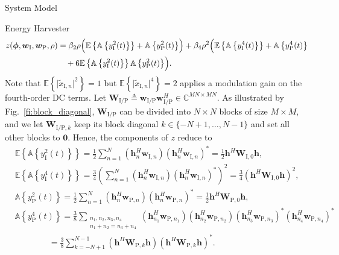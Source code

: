 \documentclass[journal,12pt,onecolumn,draftclsnofoot]{IEEEtran}
\begin{document}
\begin{section}{System Model}
\begin{subsection}{Energy Harvester}
			\begin{align}
				z(\boldsymbol{\phi},\boldsymbol{w}_{\mathrm{I}},\boldsymbol{w}_{\mathrm{P}},\rho) & = \beta_2\rho\Bigl(\mathbb{E}\left\{\mathbb{A}\left\{y_{\mathrm{I}}^2(t)\right\}\right\}+\mathbb{A}\left\{y_{\mathrm{P}}^2(t)\right\}\Bigr)+\beta_4\rho^2\Bigl(\mathbb{E}\left\{\mathbb{A}\left\{y_{\mathrm{I}}^4(t)\right\}\right\}+\mathbb{A}\left\{y_{\mathrm{P}}^4(t)\right\}\nonumber\\
				&\quad+6\mathbb{E}\left\{\mathbb{A}\left\{y_{\mathrm{I}}^2(t)\right\}\right\}\mathbb{A}\left\{y_{\mathrm{P}}^2(t)\right\}\Bigr).\label{eq:z_expand}
			\end{align}
			Note that $\mathbb{E}\left\{\lvert\tilde{x}_{\mathrm{I},n}\rvert^2\right\}=1$ but $\mathbb{E}\left\{\lvert\tilde{x}_{\mathrm{I},n}\rvert^4\right\}=2$ applies a modulation gain on the fourth-order DC terms. Let $\boldsymbol{W}_{\mathrm{I/P}} \triangleq \boldsymbol{w}_{\mathrm{I/P}}\boldsymbol{w}_{\mathrm{I/P}}^H \in \mathbb{C}^{MN \times MN}$. As illustrated by Fig.~\ref{fi:block_diagonal}, $\boldsymbol{W}_{\mathrm{I/P}}$ can be divided into $N \times N$ blocks of size $M \times M$, and we let $\boldsymbol{W}_{\mathrm{I/P},k}$ keep its block diagonal $k \in \{-N+1,\dots,N-1\}$ and set all other blocks to $\boldsymbol{0}$. Hence, the components of $z$ reduce to
			\begin{align}
				&\mathbb{E}\left\{\mathbb{A}\left\{y_{\mathrm{I}}^2(t)\right\}\right\} = \frac{1}{2}\sum_{n=1}^N{(\boldsymbol{h}_{n}^H\boldsymbol{w}_{\mathrm{I},n})(\boldsymbol{h}_{n}^H\boldsymbol{w}_{\mathrm{I},n})^*} = \frac{1}{2}\boldsymbol{h}^H\boldsymbol{W}_{\mathrm{I},0}\boldsymbol{h},\label{eq:y_I2}\\
				&\mathbb{E}\left\{\mathbb{A}\left\{y_{\mathrm{I}}^4(t)\right\}\right\} = \frac{3}{4}\left(\sum_{n=1}^N{(\boldsymbol{h}_{n}^H\boldsymbol{w}_{\mathrm{I},n})(\boldsymbol{h}_{n}^H\boldsymbol{w}_{\mathrm{I},n})^*}\right)^2 = \frac{3}{4}(\boldsymbol{h}^H\boldsymbol{W}_{\mathrm{I},0}\boldsymbol{h})^2,\label{eq:y_I4}\\
				&\mathbb{A}\left\{y_{\mathrm{P}}^2(t)\right\} = \frac{1}{2}\sum_{n=1}^N{(\boldsymbol{h}_{n}^H\boldsymbol{w}_{\mathrm{P},n})(\boldsymbol{h}_{n}^H\boldsymbol{w}_{\mathrm{P},n})^*} = \frac{1}{2}\boldsymbol{h}^H\boldsymbol{W}_{\mathrm{P},0}\boldsymbol{h},\label{eq:y_P2}\\
				&\mathbb{A}\left\{y_{\mathrm{P}}^4(t)\right\} = \frac{3}{8}\sum_{\substack{{n_1},{n_2},{n_3},{n_4}\\{n_1}+{n_2}={n_3}+{n_4}}}{(\boldsymbol{h}_{{n_1}}^H\boldsymbol{w}_{\mathrm{P},{n_1}})(\boldsymbol{h}_{{n_2}}^H\boldsymbol{w}_{\mathrm{P},{n_2}})(\boldsymbol{h}_{{n_3}}^H\boldsymbol{w}_{\mathrm{P},{n_3}})^*(\boldsymbol{h}_{{n_4}}^H\boldsymbol{w}_{\mathrm{P},{n_4}})^*}\nonumber\\
				&\qquad\qquad=\frac{3}{8}\sum_{k=-N+1}^{N-1}(\boldsymbol{h}^H\boldsymbol{W}_{\mathrm{P},k}\boldsymbol{h})(\boldsymbol{h}^H\boldsymbol{W}_{\mathrm{P},k}\boldsymbol{h})^*.\label{eq:y_P4}
			\end{align}


\end{subsection}
\end{section}
\end{document}
